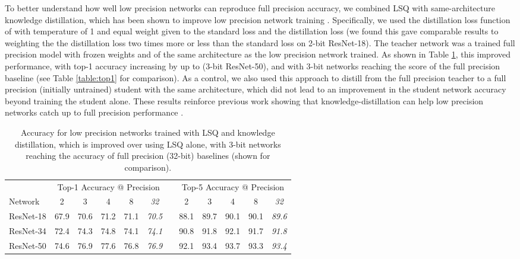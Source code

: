 \documentclass{article}
\begin{document}
To better understand how well low precision networks can reproduce full precision accuracy, we combined LSQ with same-architecture knowledge distillation, which has been shown to improve low precision network training \citep{mishra2017apprentice}.
Specifically, we used the distillation loss function of \citet{hinton2015distilling} with temperature of 1 and equal weight given to the standard loss and the distillation loss (we found this gave comparable results to weighting the the distillation loss two times more or less than the standard loss on 2-bit ResNet-18).  The teacher network was a trained full precision model with frozen weights and of the same architecture as the low precision network trained.
As shown in Table \ref{table:kd}, this improved performance, with top-1 accuracy increasing by up to  (3-bit ResNet-50), and with 3-bit networks reaching the score of the full precision baseline (see Table \ref{table:top1} for comparison).
As a control, we also used this approach to distill from the full precision teacher to a full precision (initially untrained) student with the same architecture, which did not lead to an improvement in the student network accuracy beyond training the student alone.
These results reinforce previous work showing that knowledge-distillation can help low precision networks catch up to full precision performance \citep{mishra2017apprentice}.


\begin{table}[h]
	\caption{Accuracy for low precision networks trained with LSQ and knowledge distillation, which is improved over using LSQ alone, with 3-bit networks reaching the accuracy of full precision (32-bit) baselines (shown for comparison).}
	\label{table:kd}
	\setlength\tabcolsep{6pt}
\begin{center}
\small
\begin{tabular}{l ccccc c ccccc}
		\toprule
		& \multicolumn{5}{c}{Top-1 Accuracy @ Precision} & & \multicolumn{5}{c}{Top-5 Accuracy @ Precision} \\
Network  & 2 & 3 & 4 & 8 & \textit{32} & & 2 & 3 & 4 & 8 & \textit{32}\\
		\midrule
		ResNet-18 	& 67.9	& 70.6	& 71.2	& 71.1	& \textit{70.5}	& 	& 88.1	& 89.7	& 90.1	& 90.1	& \textit{89.6} \\
		ResNet-34 	& 72.4	& 74.3	& 74.8	& 74.1	& \textit{74.1}	&	& 90.8	& 91.8	& 92.1	& 91.7 	& \textit{91.8} \\		
		ResNet-50 	& 74.6	& 76.9	& 77.6	& 76.8	& \textit{76.9}	& 	& 92.1	& 93.4	& 93.7	& 93.3 	& \textit{93.4} \\				
		\bottomrule
	\end{tabular}
\end{center}
\end{table}
\end{document}
